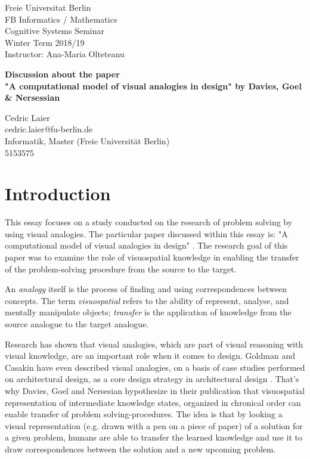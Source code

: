 \documentclass[12pt]{article}
\begin{document}
\noindent
Freie Universitat Berlin\\
FB Informatics / Mathematics\\
Cognitive Systems Seminar\\
Winter Term 2018/19\\
Instructor: Ana-Maria Olteteanu
\vspace{5cm}
\begin{center}
{\LARGE \textbf{Discussion about the paper \\"A computational model of visual analogies in design" by Davies, Goel \& Nersessian}}
\end{center}
\vspace{6,5cm}

\noindent
Cedric Laier \\
cedric.laier@fu-berlin.de\\
Informatik, Master (Freie Universität Berlin) \\
5153575 \\
\clearpage


\section{Introduction}

\noindent This essay focuses on a study conducted on the research of problem solving by using visual analogies. The particular paper discussed within this essay is: "A computational model of visual analogies in design" \cite{davies2009computational}. The research goal of this paper was to examine the role of visuospatial knowledge in enabling the transfer of the problem-solving procedure from the source to the target.

An \textit{analogy} itself is the process of finding and using correspondences between concepts. The term \textit{visuospatial} refers to the ability of represent, analyse, and mentally manipulate objects; \textit{transfer} is the application of knowledge from the source analogue to the target analogue.

Research has shown that visual analogies, which are part of visual reasoning with visual knowledge, are an important role when it comes to design. Goldman and Casakin have even described visual analogies, on a basis of case studies performed on architectural design, as a core design strategy in architectural design \cite{casakin1999expertise}. That's why Davies, Goel and Nersesian hypothesize in their publication that visuospatial representation of intermediate knowledge states, organized in chronical order can enable transfer of problem solving-procedures. The idea is that by looking a visual representation (e.g. drawn with a pen on a piece of paper) of a solution for a given problem, humans are able to transfer the learned knowledge and use it to draw correspondences between the solution and a new upcoming problem. 
\end{document}
